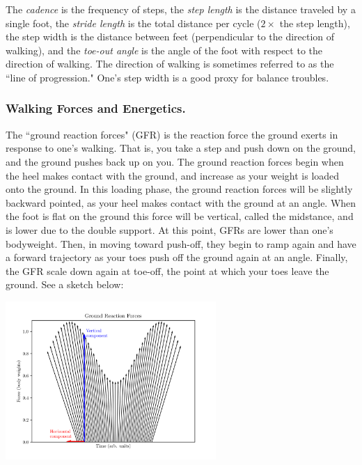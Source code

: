 The \textit{cadence} is the frequency of steps, the \textit{step length} is the distance traveled by a single foot, the \textit{stride length} is the total distance per cycle ($2\times$ the step length), the step width is the distance between feet (perpendicular to the direction of walking), and the \textit{toe-out angle} is the angle of the foot with respect to the direction of walking. The direction of walking is sometimes referred to as the ``line of progression." One's step width is a good proxy for balance troubles. 

\subsubsection{Walking Forces and Energetics.}

The ``ground reaction forces" (GFR) is the reaction force the ground exerts in response to one's walking. That is, you take a step and push down on the ground, and the ground pushes back up on you. The ground reaction forces begin when the heel makes contact with the ground, and increase as your weight is loaded onto the ground. In this loading phase, the ground reaction forces will be slightly backward pointed, as your heel makes contact with the ground at an angle. When the foot is flat on the ground this force will be vertical, called the midstance, and is lower due to the double support. At this point, GFRs are lower than one's bodyweight. Then, in moving toward push-off, they begin to ramp again and have a forward trajectory as your toes push off the ground again at an angle. Finally, the GFR scale down again at toe-off, the point at which your toes leave the ground. See a sketch below:

\begin{center}
\includegraphics[width=0.6\textwidth]{images/gaitcycle.png}
\end{center}

